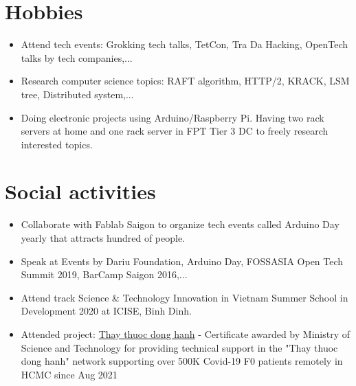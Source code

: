 \documentclass[letterpaper,11pt]{article}
\newcommand{\resumeItemNornal}[1]{
  \item\small{
    {#1 \vspace{-2pt}}
  }
}
\newcommand{\resumeSubItemNormal}[1]{\resumeItemNornal{#1}\vspace{-4pt}}
\newcommand{\resumeSubHeadingListStart}{\begin{itemize}[leftmargin=*]}
\newcommand{\resumeSubHeadingListEnd}{\end{itemize}}
\begin{document}
\section{Hobbies}
  \resumeSubHeadingListStart
    \resumeSubItemNormal
      {Attend tech events: Grokking tech talks, TetCon, Tra Da Hacking, OpenTech talks by tech companies,...}
    \resumeSubItemNormal
      {Research computer science topics: RAFT algorithm, HTTP/2, KRACK, LSM tree, Distributed system,...}
  \resumeSubItemNormal
      {Doing electronic projects using Arduino/Raspberry Pi. Having two rack servers at home and one rack server in FPT Tier 3 DC to freely research interested topics.}
\resumeSubHeadingListEnd

\section{Social activities}
  \resumeSubHeadingListStart
    \resumeSubItemNormal
      {Collaborate with Fablab Saigon to organize tech events called Arduino Day yearly that attracts hundred of people.}
    \resumeSubItemNormal
      {Speak at Events by Dariu Foundation, Arduino Day, FOSSASIA Open Tech Summit 2019, BarCamp Saigon 2016,...}
    \resumeSubItemNormal
      {Attend track Science \& Technology Innovation in Vietnam Summer School in Development 2020 at ICISE, Binh Dinh.}
    \resumeSubItemNormal
      {Attended project: \href{https://thaythuocdonghanh.vn}{Thay thuoc dong hanh} - Certificate awarded by Ministry of Science and Technology for providing technical support in the "Thay thuoc dong hanh" network supporting over 500K Covid-19 F0 patients remotely in HCMC since Aug 2021}
\resumeSubHeadingListEnd



\end{document}
